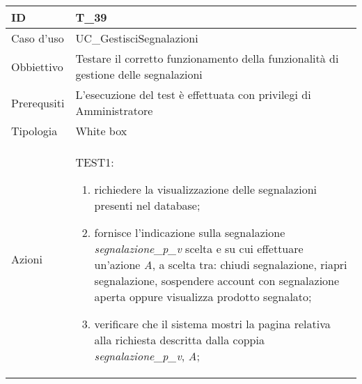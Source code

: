 \begin{table}[hb]
    \centering
    \begin{tabular}{ |p{2cm}|p{10cm}|  }
        \hline
        ID          & T\_39                                                                              \\\hline
        Caso d'uso  & UC\_GestisciSegnalazioni                                                           \\\hline
        Obbiettivo  & Testare il corretto funzionamento della funzionalità di gestione delle segnalazioni \\\hline
        Prerequsiti & L'esecuzione del test è effettuata con privilegi di Amministratore                         \\\hline
        Tipologia   & White box                                                                          \\\hline
        Azioni      &
        TEST1:
        \begin{enumerate}[nosep, topsep=0pt]
            \item richiedere la visualizzazione delle segnalazioni presenti nel database;
            \item fornisce l'indicazione sulla segnalazione \emph{segnalazione\_p\_v} scelta e su cui effettuare un'azione \emph{A}, a scelta tra: chiudi segnalazione, riapri segnalazione, sospendere account con segnalazione aperta oppure visualizza prodotto segnalato;
            \item verificare che il sistema mostri la pagina relativa alla richiesta descritta dalla coppia \emph{segnalazione\_p\_v}, \emph{A};
        \end{enumerate}
        \\\hline
    \end{tabular}
\end{table}

